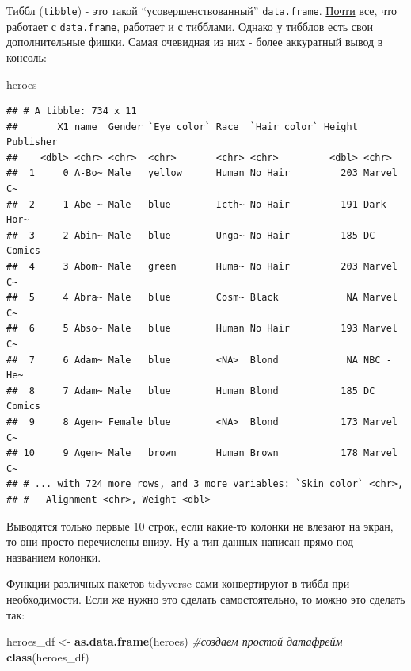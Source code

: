 \documentclass[]{book}
\newenvironment{Shaded}{\begin{snugshade}}{\end{snugshade}}
\newcommand{\KeywordTok}[1]{\textcolor[rgb]{0.13,0.29,0.53}{\textbf{#1}}}
\newcommand{\StringTok}[1]{\textcolor[rgb]{0.31,0.60,0.02}{#1}}
\newcommand{\CommentTok}[1]{\textcolor[rgb]{0.56,0.35,0.01}{\textit{#1}}}
\newcommand{\NormalTok}[1]{#1}
\begin{document}
Тиббл (\texttt{tibble}) - это такой ``усовершенствованный''
\texttt{data.frame}.
\href{https://www.jumpingrivers.com/blog/the-trouble-with-tibbles/}{Почти}
все, что работает с \texttt{data.frame}, работает и с тибблами. Однако у
тибблов есть свои дополнительные фишки. Самая очевидная из них - более
аккуратный вывод в консоль:

\begin{Shaded}
\begin{Highlighting}[]
\NormalTok{heroes}
\end{Highlighting}
\end{Shaded}

\begin{verbatim}
## # A tibble: 734 x 11
##       X1 name  Gender `Eye color` Race  `Hair color` Height Publisher
##    <dbl> <chr> <chr>  <chr>       <chr> <chr>         <dbl> <chr>    
##  1     0 A-Bo~ Male   yellow      Human No Hair         203 Marvel C~
##  2     1 Abe ~ Male   blue        Icth~ No Hair         191 Dark Hor~
##  3     2 Abin~ Male   blue        Unga~ No Hair         185 DC Comics
##  4     3 Abom~ Male   green       Huma~ No Hair         203 Marvel C~
##  5     4 Abra~ Male   blue        Cosm~ Black            NA Marvel C~
##  6     5 Abso~ Male   blue        Human No Hair         193 Marvel C~
##  7     6 Adam~ Male   blue        <NA>  Blond            NA NBC - He~
##  8     7 Adam~ Male   blue        Human Blond           185 DC Comics
##  9     8 Agen~ Female blue        <NA>  Blond           173 Marvel C~
## 10     9 Agen~ Male   brown       Human Brown           178 Marvel C~
## # ... with 724 more rows, and 3 more variables: `Skin color` <chr>,
## #   Alignment <chr>, Weight <dbl>
\end{verbatim}

Выводятся только первые 10 строк, если какие-то колонки не влезают на
экран, то они просто перечислены внизу. Ну а тип данных написан прямо
под названием колонки.

Функции различных пакетов tidyverse сами конвертируют в тиббл при
необходимости. Если же нужно это сделать самостоятельно, то можно это
сделать так:

\begin{Shaded}
\begin{Highlighting}[]
\NormalTok{heroes_df <-}\StringTok{ }\KeywordTok{as.data.frame}\NormalTok{(heroes) }\CommentTok{#создаем простой датафрейм}
\KeywordTok{class}\NormalTok{(heroes_df)}
\end{Highlighting}
\end{Shaded}
\end{document}

